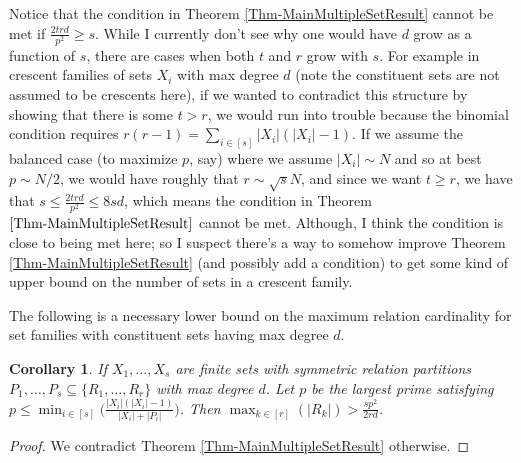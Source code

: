 \documentclass[12pt]{article}
\DeclarePairedDelimiter\ceil{\lceil}{\rceil}
\newtheorem{cor}[thm]{Corollary}
\theoremstyle{definition}
\begin{document}
	Notice that the condition in Theorem \ref{Thm-MainMultipleSetResult} cannot be met if $\tfrac{2trd}{p^2} \geq s$.  While I currently don't see why one would have $d$ grow as a function of $s$, there are cases when both $t$ and $r$ grow with $s$.  For example in crescent families of sets $X_i$ with max degree $d$ (note the constituent sets are not assumed to be crescents here), if we wanted to contradict this structure by showing that there is some $t > r$, we would run into trouble because the binomial condition requires $r(r-1)= \sum_{i\in[s]}|X_i|(|X_i|-1)$.  If we assume the balanced case (to maximize $p$, say) where we assume $|X_i| \sim N$ and so at best $p \sim N/2$, we would have roughly that $r \sim \sqrt{s}N$, and since we want $t \geq r$, we have that $s \leq \tfrac{2trd}{p^2} \leq 8sd$, which means the condition in Theorem $\ref{Thm-MainMultipleSetResult}$ cannot be met.  Although, I think the condition is close to being met here; so I suspect there's a way to somehow improve Theorem \ref{Thm-MainMultipleSetResult} (and possibly add a condition) to get some kind of upper bound on the number of sets in a crescent family.
	
	The following is a necessary lower bound on the maximum relation cardinality for set families with constituent sets having max degree $d$.
	
	\begin{cor}
		If $X_1,\ldots,X_s$ are finite sets with symmetric relation partitions $P_1,\ldots, P_s \subseteq \{R_1,\ldots, R_r\}$ with max degree $d$.  Let $p$ be the largest prime satisfying $p \leq \min_{i \in [s]}\big(\tfrac{|X_i|(|X_i|-1)}{|X_i|+|P_i|} \big)$.  Then $\max_{k\in[r]}(|R_k|) > \tfrac{sp^2}{2rd}$.  
	\end{cor}
	\begin{proof}
		We contradict Theorem \ref{Thm-MainMultipleSetResult} otherwise. 
	\end{proof}
	
	
\end{document}
